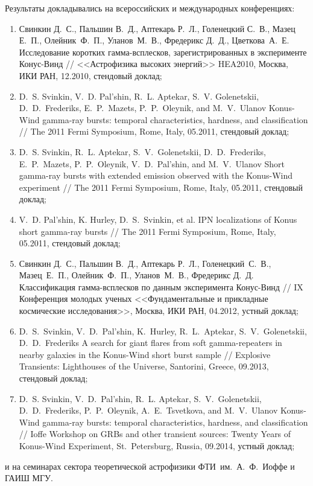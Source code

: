 Результаты докладывались на всероссийских и международных конференциях: 
\begin{enumerate}
\item Свинкин Д.~С., Пальшин В.~Д., Аптекарь Р.~Л., Голенецкий С.~В., Мазец Е.~П., 
    Олейник~Ф.~П., Уланов~М.~В., Фредерикс Д.~Д., Цветкова~А.~Е.  
    Исследование коротких гамма-всплесков, зарегистрированных в эксперименте Конус-Винд //
    <<Астрофизика высоких энергий>> HEA2010, Москва, ИКИ РАН, 12.2010, стендовый доклад;
\item D.~S. Svinkin, V.~D. Pal'shin, R.~L. Aptekar, S.~V. Golenetskii, D.~D.~Frederiks, 
    E.~P.~Mazets, P.~P.~Oleynik, and M.~V.~Ulanov 
    Konus-Wind gamma-ray bursts: temporal characteristics, hardness, and classification //
    The 2011 Fermi Symposium, Rome, Italy, 05.2011, стендовый доклад;
\item D.~S. Svinkin, R.~L. Aptekar, S.~V.~Golenetskii, D.~D.~Frederiks, E.~P.~Mazets,
    P.~P.~Oleynik, V.~D.~Pal'shin, and M.~V.~Ulanov  
    Short gamma-ray bursts with extended emission observed with the Konus-Wind experiment //
    The 2011 Fermi Symposium, Rome, Italy, 05.2011, стендовый доклад;
\item V.~D. Pal'shin, K. Hurley, D.~S.~Svinkin, et al. 
    IPN localizations of Konus short gamma-ray bursts // 
    The 2011 Fermi Symposium, Rome, Italy, 05.2011, стендовый доклад;
\item Свинкин Д.~С., Пальшин В.~Д., Аптекарь Р.~Л., Голенецкий~С.~В., Мазец~Е.~П., 
    Олейник~Ф.~П., Уланов~М.~В., Фредерикс Д.~Д.  
    Классификация гамма-всплесков по данным эксперимента Конус-Винд //
    IX Конференция молодых ученых <<Фундаментальные и прикладные космические исследования>>, 
    Москва, ИКИ РАН, 04.2012, устный доклад;
\item D.~S.~Svinkin, V.~D.~Pal'shin, K.~Hurley, R.~L.~Aptekar, S.~V.~Golenetskii, D.~D.~Frederiks
    A search for giant flares from soft gamma-repeaters in nearby galaxies in the Konus-Wind short burst sample //
    Explosive Transients: Lighthouses of the Universe, Santorini, Greece, 09.2013, стендовый доклад;
\item D.~S. Svinkin, V.~D.~Pal'shin, R.~L. Aptekar, S.~V.~Golenetskii, D.~D.~Frederiks, 
    P.~P.~Oleynik, A.~E.~Tsvetkova, and M.~V.~Ulanov
    Konus-Wind gamma-ray bursts: temporal characteristics, hardness, and classification //
    Ioffe Workshop on GRBs and other transient sources: Twenty Years of Konus-Wind Experiment, 
    St.~Petersburg, Russia, 09.2014, устный доклад;
\end{enumerate}
и на семинарах сектора теоретической астрофизики ФТИ~им.~А.~Ф.~Иоффе и ГАИШ МГУ.

